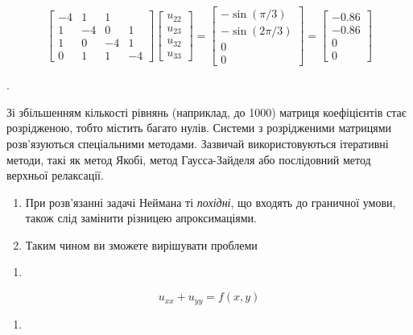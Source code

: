 \documentclass[
  ukrainian,
]{article}
\providecommand{\tightlist}{%
  \setlength{\itemsep}{0pt}\setlength{\parskip}{0pt}}
\begin{document}
\[
\begin{bmatrix} -4 & 1 & 1 \\ 1 & -4 & 0 & 1 \\ 1 & 0 & -4 & 1 \\ 0 & 1 & 1 & -4 \end{bmatrix}
\begin{bmatrix} u_{22} \\ u_{23} \\ u_{32} \\ u_{33} \end{bmatrix}
=
\begin{bmatrix} -\sin{(\pi/3)} \\ -\sin{(2\pi/3)} \\ 0 \\ 0 \end{bmatrix}
=
\begin{bmatrix} -0.86 \\ -0.86 \\ 0 \\ 0 \end{bmatrix}
\]

.

Зі збільшенням кількості рівнянь (наприклад, до 1000) матриця
коефіцієнтів стає розрідженою, тобто містить багато нулів. Системи з
розрідженими матрицями розв'язуються спеціальними методами. Зазвичай
використовуються ітеративні методи, такі як метод Якобі, метод
Гаусса-Зайделя або послідовний метод верхньої релаксації.

\begin{enumerate}
\def\labelenumi{\arabic{enumi}.}
\setcounter{enumi}{3}
\item
  При розв'язанні задачі Неймана ті \emph{похідні}, що входять до
  граничної умови, також слід замінити різницею апроксимаціями.
\item
  Таким чином ви зможете вирішувати проблеми
\end{enumerate}

\begin{enumerate}
\def\labelenumi{\alph{enumi})}
\tightlist
\item
\end{enumerate}

\[
u_{xx} + u_{yy} = f(x, y)
\]

\begin{enumerate}
\def\labelenumi{\arabic{enumi})}
\setcounter{enumi}{5}
\tightlist
\item
\end{enumerate}
\end{document}
